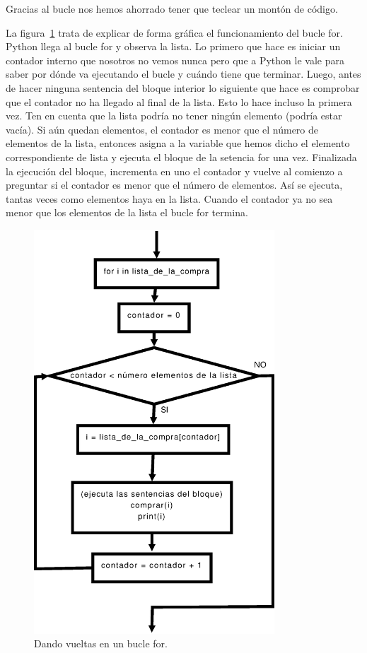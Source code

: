 Gracias al bucle nos hemos ahorrado tener que teclear un montón de código.

La figura~\ref{for} trata de explicar de forma gráfica el funcionamiento del bucle for. Python llega al bucle for y observa la lista. Lo primero que hace es iniciar un contador interno que nosotros no vemos nunca pero que a Python le vale para saber por dónde va ejecutando el bucle y cuándo tiene que terminar. Luego, antes de hacer ninguna sentencia del bloque interior lo siguiente que hace es comprobar que el contador no ha llegado al final de la lista. Esto lo hace incluso la primera vez. Ten en cuenta que la lista podría no tener ningún elemento (podría estar vacía). Si aún quedan elementos, el contador es menor que el número de elementos de la lista, entonces asigna a la variable que hemos dicho el elemento correspondiente de lista y ejecuta el bloque de la setencia for una vez. Finalizada la ejecución del bloque, incrementa en uno el contador y vuelve al comienzo a preguntar si el contador es menor que el número de elementos. Así se ejecuta, tantas veces como elementos haya en la lista. Cuando el contador ya no sea menor que los elementos de la lista el bucle for termina.

\begin{figure}
\begin{center}
\includegraphics[width=90mm]{for.eps}
\end{center}
\caption{Dando vueltas en un bucle for.}\label{for}
\end{figure}

